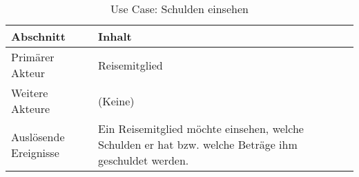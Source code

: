 \begin{table}[H]
	\footnotesize
	\caption{Use Case: Schulden einsehen}
	\begin{tabularx}{0.95\textwidth}{ |l|X| }
		\hline
		\rowcolor{gray} \textbf{Abschnitt}     & \textbf{Inhalt}                                                                                                                        \\
		\hline
		Primärer Akteur                        & Reisemitglied                                                                                                                          \\
		\hline
		Weitere Akteure                        & (Keine)                                                                                                                                \\
		\hline
		Auslösende Ereignisse                  & Ein Reisemitglied möchte einsehen, welche Schulden er hat bzw. welche Beträge ihm geschuldet werden.                                                \\


\end{tabularx}
\end{table}
